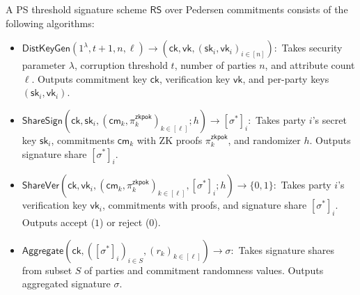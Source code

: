 \begin{definition}
A PS threshold signature scheme $\mathsf{RS}$ over Pedersen commitments consists of the following algorithms:
\begin{itemize}
    \item $\mathsf{DistKeyGen}(1^{\lambda}, t+1, n, \ell) \to (\mathsf{ck}, \mathsf{vk}, (\mathsf{sk}_i, \mathsf{vk}_i)_{i \in [n]}):$ Takes security parameter $\lambda$, corruption threshold $t$, number of parties $n$, and attribute count $\ell$. Outputs commitment key $\mathsf{ck}$, verification key $\mathsf{vk}$, and per-party keys $(\mathsf{sk}_i, \mathsf{vk}_i)$.
    
    \item $\mathsf{ShareSign}(\mathsf{ck}, \mathsf{sk}_i, (\mathsf{cm}_k, \pi_k^{\mathsf{zkpok}})_{k \in [\ell]}; h) \to [\sigma^*]_i:$ Takes party $i$'s secret key $\mathsf{sk}_i$, commitments $\mathsf{cm}_k$ with ZK proofs $\pi_k^{\mathsf{zkpok}}$, and randomizer $h$. Outputs signature share $[\sigma^*]_i$.
    
    \item $\mathsf{ShareVer}(\mathsf{ck}, \mathsf{vk}_i, (\mathsf{cm}_k, \pi_k^{\mathsf{zkpok}})_{k \in [\ell]}, [\sigma^*]_i; h) \to \{0,1\}:$ Takes party $i$'s verification key $\mathsf{vk}_i$, commitments with proofs, and signature share $[\sigma^*]_i$. Outputs accept ($1$) or reject ($0$).
    
    \item $\mathsf{Aggregate}(\mathsf{ck}, ([\sigma^*]_i)_{i \in S}, (r_k)_{k \in [\ell]}) \to \sigma:$ Takes signature shares from subset $S$ of parties and commitment randomness values. Outputs aggregated signature $\sigma$.
    
\end{itemize}
\end{definition}





